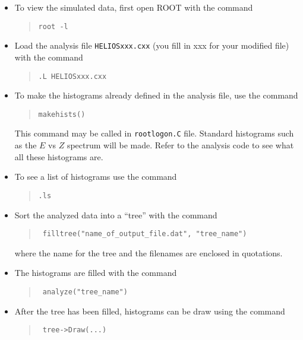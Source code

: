 \begin{itemize}
	\setlength{\itemsep}{0pt}	
  \setlength{\parskip}{0pt}
  \setlength{\parsep}{0pt}
	\item To view the simulated data, %
first open ROOT with the command
\begin{quote}
\begin{Verbatim}
root -l
\end{Verbatim}
\end{quote}
\renewcommand{\FancyVerbFormatLine}[1]{{\color{blue}root [$\emptyset$] }#1}%
	\item 	Load the analysis file \texttt{HELIOSxxx.cxx} (you fill in xxx for your modified file) with the command 
\begin{quote}
\begin{Verbatim}
.L HELIOSxxx.cxx
\end{Verbatim}
\end{quote}
	\item
	 To make the histograms already defined in the analysis file, use the command
	\begin{quote}
\begin{Verbatim}
makehists()
\end{Verbatim}
\end{quote}
	 This command may be called in \texttt{rootlogon.C} file. Standard histograms such as the $E$ vs $Z$ spectrum %
	 will be made.  Refer to the analysis code to see what all these histograms are.
	 \item To see a list of histograms use the command 
	\begin{quote}
\begin{Verbatim}
.ls
\end{Verbatim}
\end{quote}
	\item Sort the analyzed data into a ``tree'' with the command
	\begin{quote}
\begin{Verbatim}
 filltree("name_of_output_file.dat", "tree_name")
\end{Verbatim}
\end{quote}
where the name for the tree and the filenames are enclosed in quotations.
	\item
	 The histograms are filled with the command
		\begin{quote}
\begin{Verbatim}
 analyze("tree_name")
\end{Verbatim}
\end{quote}  	
	\item
	 After the tree has been filled, histograms can be draw using the command
	\begin{quote}
\begin{Verbatim}
 tree->Draw(...)
\end{Verbatim}
\end{quote}  	
	\end{itemize}



